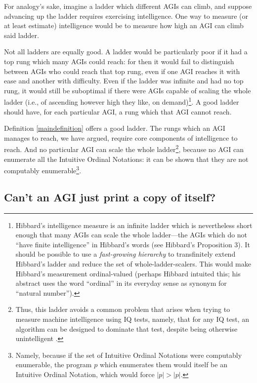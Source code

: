 \documentclass[runningheads]{llncs}
\begin{document}
For analogy's sake, imagine a ladder which different AGIs
can climb, and suppose advancing up the ladder requires exercising
intelligence. One way to measure (or at least estimate) intelligence would be
to measure how high an AGI can climb said ladder.

Not all ladders are equally good. A ladder would be particularly poor if it had
a top rung which many AGIs could reach: for then it would fail to
distinguish between AGIs who could reach that top rung, even if one
AGI reaches it with ease and another with difficulty.
Even if the ladder was infinite and had no top rung, it would still be suboptimal
if there were AGIs capable of scaling the whole
ladder (i.e., of ascending however high they like, on demand)\footnote{Hibbard's
intelligence measure
\cite{hibbard2011measuring} is an infinite ladder
which is nevertheless short enough that many AGIs can
scale the whole ladder---the AGIs which
do not ``have finite intelligence'' in Hibbard's words
(see Hibbard's Proposition 3). It should be possible to
use a \emph{fast-growing hierarchy}
\cite{weiermann2002slow}
to transfinitely extend Hibbard's ladder and reduce
the set of whole-ladder-scalers. This would make
Hibbard's measurement ordinal-valued
(perhaps Hibbard intuited this; his abstract uses the
word ``ordinal''
in its everyday sense as synonym for ``natural number'').}.
A good ladder should have, for each particular AGI, a rung which that
AGI cannot reach.

Definition \ref{maindefinition} offers a good ladder.
The rungs which an AGI
manages to reach, we have argued, require core components of intelligence
to reach.
And no particular AGI can scale
the whole ladder\footnote{Thus, this ladder avoids a common problem that arises when
trying to measure machine intelligence using IQ tests, namely, that for any IQ test,
an algorithm can be designed to dominate that
test, despite being otherwise unintelligent \cite{besold2015can}.},
because no AGI can enumerate all the Intuitive Ordinal Notations: it can
be shown
that they are not computably enumerable\footnote{Namely, because if the
set of Intuitive Ordinal Notations were computably enumerable, the program $p$ which
enumerates them would itself be an Intuitive Ordinal Notation, which would
force $|p|>|p|$.}.


\subsection{Can't an AGI just print a copy of itself?}
\end{document}
